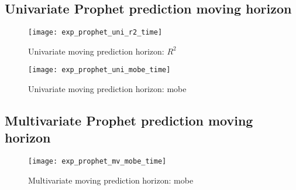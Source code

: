 \subsection{Univariate Prophet prediction moving horizon}

\begin{figure}[H]
	\centering
	\texttt{[image: exp\_prophet\_uni\_r2\_time]}
	\caption{Univariate moving prediction horizon: $R^2$}
	\label{fig:exp_prophet_uni_r2}
\end{figure}

\begin{figure}[H]
	\centering
	\texttt{[image: exp\_prophet\_uni\_mobe\_time]}
	\caption{Univariate moving prediction horizon: \ac{mobe}}
	\label{fig:exp_prophet_uni_mobe}
\end{figure}

\subsection{Multivariate Prophet prediction moving horizon}





\begin{figure}[H]
	\centering
	\texttt{[image: exp\_prophet\_mv\_mobe\_time]}
	\caption{Multivariate moving prediction horizon: \ac{mobe}}
	\label{fig:exp_prophet_mv_mobe}
\end{figure}











